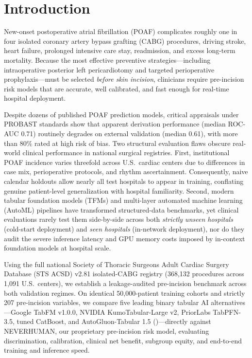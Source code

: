 \section{Introduction}

New-onset postoperative atrial fibrillation (POAF) complicates roughly one in four isolated coronary artery bypass grafting (CABG) procedures, driving stroke, heart failure, prolonged intensive care stay, readmission, and excess long-term mortality.\cite{aranki1996predictors,villareal2004,elchami2010poaf,lapar2014poaf,dobrev2019postoperative,jawitz2020poaf,caldonazo2023meta} Because the most effective preventive strategies---including intraoperative posterior left pericardiotomy and targeted perioperative prophylaxis---must be selected \emph{before skin incision},\cite{gaudino2021palacs,chatterjee2026sts} clinicians require pre-incision risk models that are accurate, well calibrated, and fast enough for real-time hospital deployment.

Despite dozens of published POAF prediction models, critical appraisals under PROBAST standards show that apparent derivation performance (median ROC-AUC 0.71) routinely degrades on external validation (median 0.61), with more than 80\% rated at high risk of bias.\cite{fields2025poaf,lopeztuesta2026poaf,pandey2023poaf,wolff2019probast,moons2025probastai} Two structural evaluation flaws obscure real-world clinical performance in national surgical registries. First, institutional POAF incidence varies threefold across U.S.\ cardiac centers due to differences in case mix, perioperative protocols, and rhythm ascertainment.\cite{filardo2017telemetry,perezgrovas2023jaha} Consequently, naive calendar holdouts allow nearly all test hospitals to appear in training, conflating genuine patient-level generalization with hospital familiarity.\cite{steyerberg2016prediction,riley2019external} Second, modern tabular foundation models (TFMs) and multi-layer automated machine learning (AutoML) pipelines have transformed structured-data benchmarks,\cite{hollmann2025tabpfn,erickson2025tabarena,erickson2020autogluon,jaeger2026tabpfn35,qu2026kumotabular,kong2026tabfm} yet clinical evaluations rarely test them side-by-side across both \emph{strictly unseen hospitals} (cold-start deployment) and \emph{seen hospitals} (in-network deployment), nor do they audit the severe inference latency and GPU memory costs imposed by in-context foundation models at hospital scale.

Using the full national Society of Thoracic Surgeons Adult Cardiac Surgery Database (STS ACSD) v2.81 isolated-CABG registry (368,132 procedures across 1,091 U.S.\ centers),\cite{sts2014v281,shahian2018sts} we establish a leakage-audited pre-incision benchmark across both validation regimes. On identical 50,000-patient training cohorts and strictly 207 pre-incision variables, we compare five leading binary tabular AI alternatives---Google TabFM v1.0.0, NVIDIA KumoTabular-Large v2, PriorLabs TabPFN-3.5, tuned CatBoost, and AutoGluon-Tabular 1.5 ()---directly against NEVERHUMAN, our proprietary pre-incision risk model, evaluating discrimination, calibration, clinical net benefit, subgroup equity, and end-to-end training and inference speed.
